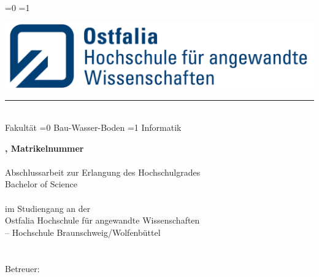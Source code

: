 
\begin{titlepage}
    
    \ifnum\value{documentfakultaet}=0
    \fi\ifnum\value{documentfakultaet}=1
    \fi
    
    \begin{flushleft}
    \includegraphics[scale=0.9]{Bilder/ostfalia_logo2.png}\\
    \color{strich} 
    \hspace{24mm}\rule{70mm}{0.25mm}\\
    \hspace{24mm}\Large
    \textsf{Fakultät
        \ifnum\value{documentfakultaet}=0
	    	Bau-Wasser-Boden
	    \fi\ifnum\value{documentfakultaet}=1
	    	Informatik
	    \fi
	}
    \end{flushleft}
    
    \begin{flushleft}
         \vspace{3em}
         {\large\textsf{\textbf{\documentname, Matrikelnummer \documentmanr}}}\\
         \vspace{3em}
        {\color{text}\fontsize{28}{32}{\textsf{\documenttitle}}}\\
        \onehalfspacing
        \vspace{4em}
        {\color{black}\large\textsf{Abschlussarbeit zur Erlangung des Hochschulgrades\\
        Bachelor of Science\\
        \ \\
        im Studiengang {\documentstudiengang} an der\\
        Ostfalia Hochschule für angewandte Wissenschaften\\
        – Hochschule Braunschweig/Wolfenbüttel\\
        \color{strich}
        \hrulefill\\
        \ \\\color{black}
        Betreuer: \documentbetreuer
        \ \\
        \ \\
        }}
        

\end{flushleft}
\end{titlepage}
